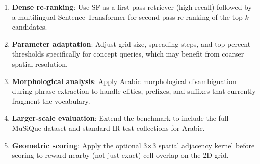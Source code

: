 \documentclass[conference]{IEEEtran}
\begin{document}
\begin{enumerate}
  \item \textbf{Dense re-ranking}: Use SF as a first-pass retriever (high
        recall) followed by a multilingual Sentence Transformer for
        second-pass re-ranking of the top-$k$ candidates.
  \item \textbf{Parameter adaptation}: Adjust grid size, spreading steps,
        and top-percent thresholds specifically for concept queries,
        which may benefit from coarser spatial resolution.
  \item \textbf{Morphological analysis}: Apply Arabic morphological
        disambiguation during phrase extraction to handle clitics,
        prefixes, and suffixes that currently fragment the vocabulary.
  \item \textbf{Larger-scale evaluation}: Extend the benchmark to include
        the full MuSiQue dataset and standard IR test collections for
        Arabic.
  \item \textbf{Geometric scoring}: Apply the optional 3$\times$3
        spatial adjacency kernel before scoring to reward nearby (not
        just exact) cell overlap on the 2D grid.
\end{enumerate}
\end{document}
